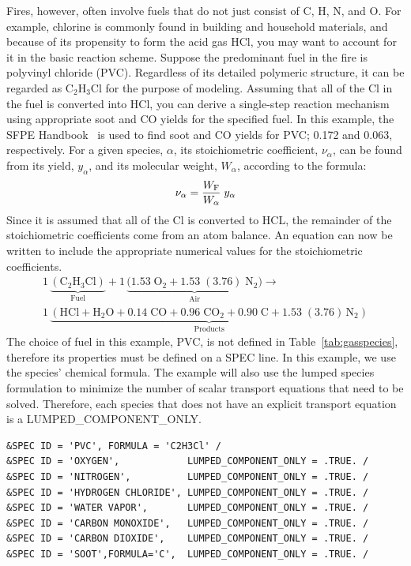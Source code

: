 \documentclass[11pt]{book}
\begin{document}
Fires, however, often involve fuels that do not just consist of C, H, N, and O. For example, chlorine is commonly found in building and household materials, and because
of its propensity to form the acid gas HCl, you may want to account for it in the basic reaction scheme. Suppose the predominant fuel in the fire is polyvinyl chloride (PVC). Regardless of its detailed polymeric structure, it can be regarded as C$_2$H$_3$Cl for the purpose of modeling. Assuming that all of the Cl in the fuel is converted into HCl, you can derive a single-step reaction mechanism using appropriate soot and CO yields for the specified fuel. In this example, the SFPE Handbook~\cite{SFPE:Tewarson} is used to find soot and CO yields for PVC; 0.172 and 0.063, respectively. For a given species, $\alpha$, its stoichiometric coefficient, $\nu_\alpha$, can be found from its yield, $y_\alpha$, and its molecular weight, $W_\alpha$, according to the formula:
\begin{equation}\label{eq:stoic_yield}
\nu_\alpha = \frac{W_{\rm F}}{W_\alpha} \; y_\alpha
\end{equation}
Since it is assumed that all of the Cl is converted to HCL, the remainder of the stoichiometric coefficients come from an atom balance. An equation can now be written to include the appropriate numerical values for the stoichiometric coefficients.
\begin{multline}\label{eq:PVC_reac2}
1\,\underbrace{\mathrm{(C_2H_3Cl)}}_\text{Fuel} + 1\,\underbrace{\mathrm{(1.53 \; O_2 + 1.53 \;(3.76) \; N_2})}_\text{Air} \longrightarrow \\
1\,\underbrace{\mathrm{(HCl +  H_2O + 0.14 \; CO + 0.96 \; CO_2 + 0.90\; C + 1.53\; (3.76) \, N_2)}}_\text{Products}
\end{multline}
The choice of fuel in this example, PVC, is not defined in Table~\ref{tab:gasspecies}, therefore its properties must be defined on a {\ct SPEC} line. In this example, we use the species' chemical formula. The example will also use the lumped species formulation to minimize the number of scalar transport equations that need to be solved. Therefore, each species that does not have an explicit transport equation is a {\ct LUMPED\_COMPONENT\_ONLY}.
\begin{lstlisting}
&SPEC ID = 'PVC', FORMULA = 'C2H3Cl' /
&SPEC ID = 'OXYGEN',            LUMPED_COMPONENT_ONLY = .TRUE. /
&SPEC ID = 'NITROGEN',          LUMPED_COMPONENT_ONLY = .TRUE. /
&SPEC ID = 'HYDROGEN CHLORIDE', LUMPED_COMPONENT_ONLY = .TRUE. /
&SPEC ID = 'WATER VAPOR',       LUMPED_COMPONENT_ONLY = .TRUE. /
&SPEC ID = 'CARBON MONOXIDE',   LUMPED_COMPONENT_ONLY = .TRUE. /
&SPEC ID = 'CARBON DIOXIDE',    LUMPED_COMPONENT_ONLY = .TRUE. /
&SPEC ID = 'SOOT',FORMULA='C',  LUMPED_COMPONENT_ONLY = .TRUE. /
\end{lstlisting}
\end{document}
